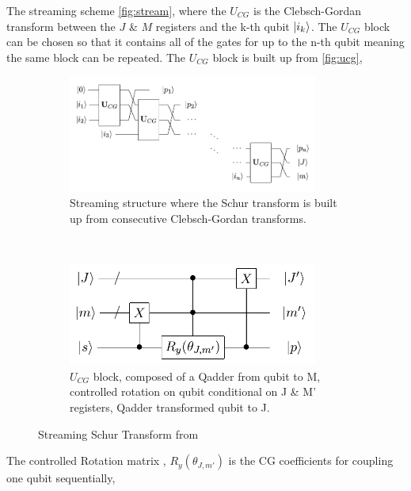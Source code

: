 \documentclass[12pt]{article}
\begin{document}
The streaming scheme \autoref{fig:stream}, where the $U_{CG}$ is the Clebsch-Gordan transform between the $J$ \& $M$ registers and the k-th qubit $\left\vert{i_k}\right\rangle$. The $U_{CG}$ block can be chosen so that it contains all of the gates for up to the n-th qubit meaning the same block can be repeated. The $U_{CG}$ block is built up from \autoref{fig:ucg},  

\begin{figure}[H]
\centering
\begin{subfigure}[H]{0.49\textwidth}
\centering
\includegraphics[width=0.9\textwidth]{schurcascade.png}
\caption{Streaming structure where the Schur transform is built up from consecutive Clebsch-Gordan transforms.}
\label{fig:stream}
\end{subfigure}
~
\begin{subfigure}[H]{0.49\textwidth}
\centering
\includegraphics[width=0.9\textwidth]{genaddercirc.png}
\caption{$U_{CG}$ block, composed of a Qadder from qubit to M, controlled rotation on qubit conditional on J \& M' registers, Qadder transformed qubit to J.}
\label{fig:ucg}
\end{subfigure}
\caption{Streaming Schur Transform from \cite{bacon2006efficient}}  
\end{figure}

The controlled Rotation matrix \cite{bacon2006efficient}, $R_y(\theta_{J,m'})$ is the CG coefficients for coupling one qubit sequentially,
\end{document}
